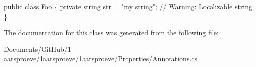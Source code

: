 \begin{DoxyCode}
\textcolor{keyword}{public} \textcolor{keyword}{class }Foo \{
  \textcolor{keyword}{private} \textcolor{keywordtype}{string} str = \textcolor{stringliteral}{"my string"}; \textcolor{comment}{// Warning: Localizable string}
\}
\end{DoxyCode}


The documentation for this class was generated from the following file\+:\begin{DoxyCompactItemize}
\item 
Documents/\+Git\+Hub/1-\/aarsproeve/1aarsproeve/1aarsproeve/\+Properties/Annotations.\+cs\end{DoxyCompactItemize}
